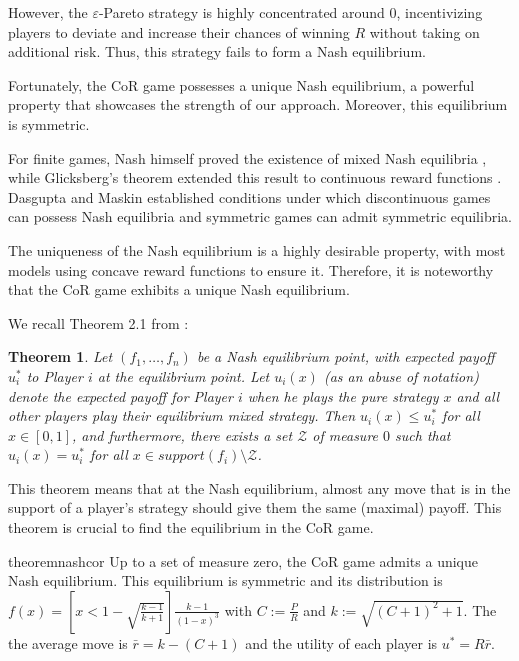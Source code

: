 \documentclass[preprint,12pt,authoryear]{elsarticle}
\newtheorem{theorem}{Theorem}[section]
\theoremstyle{definition}
\begin{document}
However, the $\varepsilon$-Pareto strategy is highly concentrated around $0$, incentivizing players to deviate and increase their chances of winning $R$ without taking on additional risk. Thus, this strategy fails to form a Nash equilibrium.

Fortunately, the CoR game possesses a unique Nash equilibrium, a powerful property that showcases the strength of our approach. Moreover, this equilibrium is symmetric.

For finite games, Nash himself proved the existence of mixed Nash equilibria \citep{Nash1950-jp}, while Glicksberg's theorem extended this result to continuous reward functions \citep{Glicksberg1951-wp}. Dasgupta and Maskin \citep{Dasgupta1986-gu} established conditions under which discontinuous games can possess Nash equilibria and symmetric games can admit symmetric equilibria.

The uniqueness of the Nash equilibrium is a highly desirable property, with most models using concave reward functions to ensure it. Therefore, it is noteworthy that the CoR game exhibits a unique Nash equilibrium.

We recall Theorem 2.1 from \citet{Lotker2008-tx}:

\begin{theorem}
\label{thm:jules}
Let $(f_1, \ldots , f_n)$ be a Nash equilibrium point, with expected payoff $u_i^*$ to Player $i$ at the equilibrium point. Let $u_i(x)$ (as an abuse of notation) denote the expected payoff for Player $i$ when he plays the pure strategy $x$ and all other players play their equilibrium mixed strategy. Then $u_i(x) \leq u_i^*$ for all $x \in [0, 1]$, and furthermore, there exists a set $\mathcal{Z}$ of measure $0$ such that $u_i(x) = u_i^*$ for all $x \in support(f_i) \setminus \mathcal{Z}$.
\end{theorem}

This theorem means that at the Nash equilibrium, almost any move that is in the support of a player's strategy should give them the same (maximal) payoff. This theorem is crucial to find the equilibrium in the CoR game.

\begin{restatable}{theorem}{nashcor}
\label{thm:nashcor}
Up to a set of measure zero, the CoR game admits a unique Nash equilibrium. This equilibrium is symmetric and its distribution is $f(x) = \left[x < 1 - \sqrt{\frac{k - 1}{k + 1}}\right] \frac{ k - 1}{(1-x)^3}$ with $C := \frac{P}{R}$ and $k := \sqrt{(C + 1)^2 + 1}$. The the average move is $\bar r = k - (C+1)$ and the utility of each player is $u^* = R \bar r$.
\end{restatable}
\end{document}
